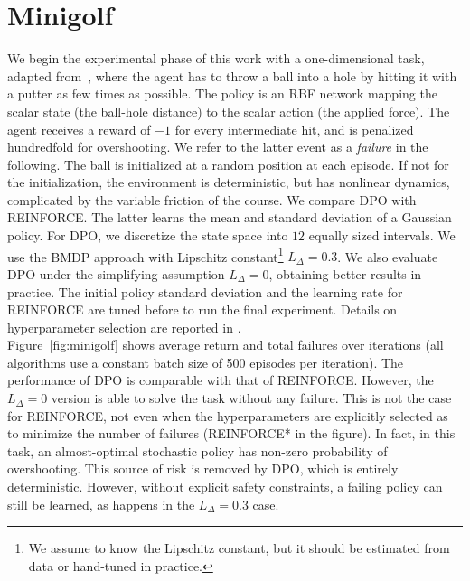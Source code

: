 \section{Minigolf}\label{sec:mini}
We begin the experimental phase of this work with a one-dimensional task, adapted from~\citet{doro2019gradient}, where the agent has to throw a ball into a hole by hitting it with a putter as few times as possible. The policy is an \ac{RBF} network mapping the scalar state (the ball-hole distance) to the scalar action (the applied force). 
The agent receives a reward of $-1$ for every intermediate hit, and is penalized hundredfold for overshooting. We refer to the latter event as a \textit{failure} in the following.
The ball is initialized at a random position at each episode. If not for the initialization, the environment is deterministic, but has nonlinear dynamics, complicated by the variable friction of the course.
We compare \ac{DPO} with REINFORCE. The latter learns the mean and standard deviation of a Gaussian policy.
For \ac{DPO}, we discretize the state space into $12$ equally sized intervals. We use the \ac{BMDP} approach with Lipschitz constant\footnote{We assume to know the Lipschitz constant, but it should be estimated from data or hand-tuned in practice.} $L_{\Delta}=0.3$. We also evaluate \ac{DPO} under the simplifying assumption $L_{\Delta}=0$, obtaining better results in practice.
The initial policy standard deviation and the learning rate for REINFORCE are tuned before to run the final experiment.
Details on hyperparameter selection are reported in .\\
\newline
Figure~\ref{fig:minigolf} shows average return and total failures over iterations (all algorithms use a constant batch size of 500 episodes per iteration). The performance of \ac{DPO} is comparable with that of REINFORCE. However, the $L_{\Delta}=0$ version is able to solve the task without any failure. This is not the case for REINFORCE, not even when the hyperparameters are explicitly selected as to minimize the number of failures (REINFORCE* in the figure). In fact, in this task, an almost-optimal stochastic policy has non-zero probability of overshooting. This source of risk is removed by \ac{DPO}, which is entirely deterministic. However, without explicit safety constraints, a failing policy can still be learned, as happens in the $L_{\Delta}=0.3$ case.

